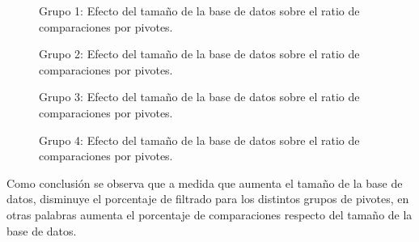 \begin{figure}[H]
\centering
{}
		\caption{\small Grupo 1: Efecto del tamaño de la base de datos sobre el ratio de comparaciones por pivotes.}
		\label{fig:EDB-g1}

\centering
{}
		\caption{\small Grupo 2: Efecto del tamaño de la base de datos sobre el ratio de comparaciones por pivotes.}
		\label{fig:EDB-g2}

\centering
{}
		\caption{\small Grupo 3: Efecto del tamaño de la base de datos sobre el ratio de comparaciones por pivotes.}
		\label{fig:EDB-g3}
		
\end{figure}

\begin{figure}[H]
\centering
{}
		\caption{\small Grupo 4: Efecto del tamaño de la base de datos sobre el ratio de comparaciones por pivotes.}
		\label{fig:EDB-g4}
\end{figure}

Como conclusi\'on se observa que a medida que aumenta el tamaño de la base de datos, disminuye el porcentaje de filtrado para los distintos grupos de pivotes, en otras palabras aumenta el porcentaje de comparaciones respecto del tamaño de la base de datos.\\





 